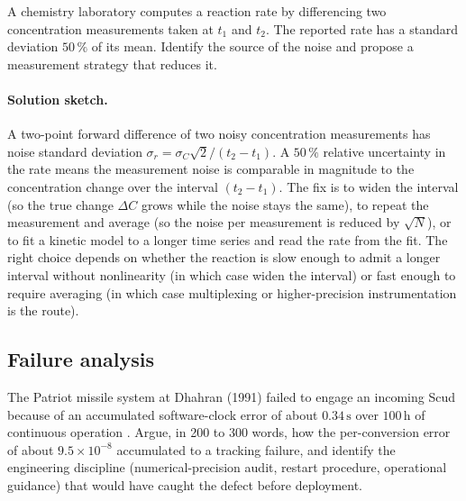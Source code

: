 \begin{exercise}
A chemistry laboratory computes a reaction rate by differencing
two concentration measurements taken at $t_{1}$ and $t_{2}$. The
reported rate has a standard deviation $50\,\%$ of its mean.
Identify the source of the noise and propose a measurement
strategy that reduces it.
\end{exercise}

\paragraph{Solution sketch.}
A two-point forward difference of two noisy concentration
measurements has noise standard deviation $\sigma_{r} =
\sigma_{C} \sqrt{2} / (t_{2} - t_{1})$. A $50\,\%$ relative
uncertainty in the rate means the measurement noise is
comparable in magnitude to the concentration change over the
interval $(t_{2} - t_{1})$. The fix is to widen the interval
(so the true change $\Delta C$ grows while the noise stays the
same), to repeat the measurement and average (so the noise per
measurement is reduced by $\sqrt{N}$), or to fit a kinetic model
to a longer time series and read the rate from the fit. The
right choice depends on whether the reaction is slow enough to
admit a longer interval without nonlinearity (in which case
widen the interval) or fast enough to require averaging
(in which case multiplexing or higher-precision instrumentation
is the route).

\subsection*{Failure analysis}

\begin{exercise}
The Patriot missile system at Dhahran (1991) failed to engage an
incoming Scud because of an accumulated software-clock error of
about $0.34\,\si{\second}$ over $100\,\si{\hour}$ of continuous
operation \cite{acc:gao-patriot-1992}. Argue, in 200 to 300 words,
how the per-conversion error of about $9.5 \times 10^{-8}$
accumulated to a tracking failure, and identify the engineering
discipline (numerical-precision audit, restart procedure,
operational guidance) that would have caught the defect before
deployment.
\end{exercise}

